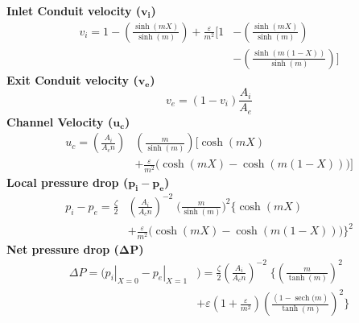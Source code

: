 \documentclass[twocolumn,10pt,cleanfoot]{ihmtc}
\begin{document}
\textbf{Inlet Conduit velocity ($\bm{v_i}$)}
\begin{equation}\label{vi} 	
\begin{split}
{v}_{i}=1-\left( \frac{\sinh (mX)}{\sinh (m)} \right)+\frac{\varepsilon }{{m}^{2}}\Biggl[ 1 & - \left( \frac{\sinh (mX)}{\sinh (m)} \right) \\
& -\left( \frac{\sinh (m(1-X))}{\sinh (m)} \right) \Biggr]
\end{split}
\end{equation}
%
%
\textbf{Exit Conduit velocity ($\bm{v_e}$)}
\begin{equation}\label{ve}
{v}_{e}=\left( 1-{v}_{i} \right)\frac{{A}_{i}}{{A}_{e}}
\end{equation}
%
%
\textbf{Channel Velocity ($\bm{u_c}$)}
\begin{equation} \label{uc} 
\begin{split}
{u}_{c}=\left(\frac{{A}_{i}}{{{A}_{c}}n} \right) & \left( \frac{m}{\sinh (m)} \right) \Biggl[ \cosh (mX)  \\ 
 & + \frac{\varepsilon }{{m}^{2}}\biggl( \cosh (mX)-\cosh (m(1-X)) \biggr) \Biggr]
\end{split}
\end{equation}
%
%
\textbf{Local pressure drop ($\bm{p_i-p_e}$)}
\begin{equation} \label{dp} 
\begin{split}
{p}_{i}-{p}_{e}=\frac{\zeta}{2} & \left( \frac{{A}_{i}}{{{A}_{c}}n} \right)^{-2}\; {\biggl( \frac{m}{\sinh (m)} \biggr)}^{2}\Biggl\{ \cosh (mX)\\
& +\frac{\varepsilon }{{m}^{2}}\biggl( \cosh (mX) - \cosh (m(1-X)) \biggr) \Biggr\}^{2}
\end{split}
\end{equation}
%
%
\textbf{Net pressure drop ($\bm{\Delta P}$)}
\begin{equation} \label{netdp} 
\begin{split}
\Delta P=\biggl({{\left. {{p}_{i}} \right|}_{X=0}}-{{\left. {{p}_{e}} \right|}_{X=1}}&\biggr)=\frac{\zeta}{2} {\left( \frac{{A}_{i}}{{{A}_{c}}n} \right)}^{-2}\; \Biggl\{{{\left( \frac{m}{\tanh (m)} \right)}^{2}} \\
& +\varepsilon \left( 1+\frac{\varepsilon }{{{m}^{2}}} \right){{\left( \frac{\left( 1-\operatorname{sech}(m \right)}{\tanh (m)} \right)}^{2}} \Biggr\}  
\end{split}
\end{equation} 
%
%
\end{document}
